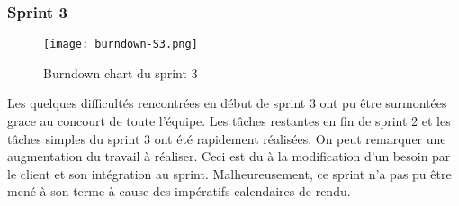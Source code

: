 \subsubsection{Sprint 3}

\begin{figure}[h]
\begin{center}
	\texttt{[image: burndown-S3.png]}
\end{center}
	\caption{Burndown chart du sprint 3}
\end{figure}

Les quelques difficultés rencontrées en début de sprint 3 ont pu être surmontées grace au concourt de toute l'équipe. Les tâches restantes en fin de sprint 2 et les tâches simples du sprint 3 ont été rapidement réalisées. On peut remarquer une augmentation du travail à réaliser. Ceci est du à la modification d'un besoin par le client et son intégration au sprint. Malheureusement, ce sprint n'a pas pu être mené à son terme à cause des impératifs calendaires de rendu.

